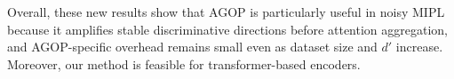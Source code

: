 \documentclass[11pt]{article}
\begin{document}
\begin{center}
\end{center}

Overall, these new results show that AGOP is particularly useful in noisy MIPL because it amplifies stable discriminative directions before attention aggregation, and AGOP-specific overhead remains small even as dataset size and $d'$ increase. Moreover, our method is feasible for transformer-based encoders.
\end{document}
